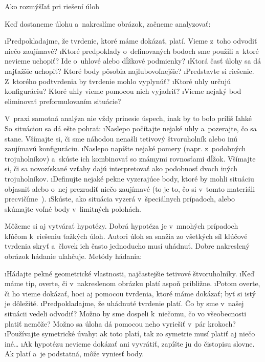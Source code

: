\secc Ako rozmýšľať pri riešení úloh

Keď dostaneme úlohu a~nakreslíme obrázok, začneme analyzovať:

\begitems
\i Predpokladajme, že tvrdenie, ktoré máme dokázať, platí. Vieme z~toho odvodiť niečo zaujímavé?
\i Ktoré predpoklady o~definovaných bodoch sme použili a~ktoré nevieme uchopiť? Ide o~uhlové alebo dĺžkové podmienky?
\i Ktorá časť úlohy sa dá najťažšie uchopiť? Ktoré body pôsobia najľubovoľnejšie?
\i Predstavte si riešenie. Z~ktorého podtvrdenia by tvrdenie mohlo vyplynúť?
\i Ktoré uhly určujú konfiguráciu? Ktoré uhly vieme pomocou nich vyjadriť?
\i Vieme nejaký bod eliminovať preformulovaním situácie?
\enditems

V~praxi samotná analýza nie vždy prinesie úspech, inak by to bolo príliš ľahké~\SlightSmile{} So situáciou sa dá ešte pohrať:
\begitems
\i Naslepo počítajte nejaké uhly a~pozerajte, čo sa stane. Všímajte si, či sme náhodou nenašli tetivový štvoruholník alebo inú zaujímavú konfiguráciu.
\i Naslepo napíšte nejaké pomery (napr. z~podobných trojuholníkov) a~skúste ich kombinovať so známymi rovnosťami dĺžok. Všímajte si, či sa novozískané vzťahy dajú interpretovať ako podobnosť dvoch iných trojuholníkov.
\i Definujte nejaké pekne vyzerajúce body, ktoré by mohli situáciu objasniť alebo o~nej prezradiť niečo zaujímavé (to je to, čo si v~tomto materiáli precvičíme~\SlightSmile{}).
\i Skúste, ako situácia vyzerá v~špeciálnych prípadoch, alebo skúmajte voľné body v~limitných polohách.
\enditems

Môžeme si aj vytvárať hypotézy. Dobrá hypotéza je v~mnohých prípadoch kľúčom k~riešeniu ťažkých úloh. Autori úloh sa snažia zo všetkých síl kľúčové tvrdenia skryť a~človek ich často jednoducho musí uhádnuť. Dobre nakreslený obrázok hádanie uľahčuje. Metódy hádania:

\begitems
\i Hádajte pekné geometrické vlastnosti, najčastejšie tetivové štvoruholníky.
\i Keď máme tip, overte, či v~nakreslenom obrázku platí aspoň približne.
\i Potom overte, či ho vieme dokázať, hoci aj pomocou tvrdenia, ktoré máme dokázať; byť si istý je dôležité.
\i Predpokladajme, že uhádnuté tvrdenie platí. Čo by sme v~našej situácii vedeli odvodiť? Možno by sme dospeli k~niečomu, čo vo všeobecnosti platiť nemôže? Možno sa úloha dá pomocou neho vyriešiť v~pár krokoch?
\i Používajte symetrické úvahy: ak toto platí, tak zo symetrie musí platiť aj niečo iné\dots
\i Ak hypotézu nevieme dokázať ani vyvrátiť, zapíšte ju do čistopisu slovne. Ak platí a~je podstatná, môže vyniesť body.
\enditems

